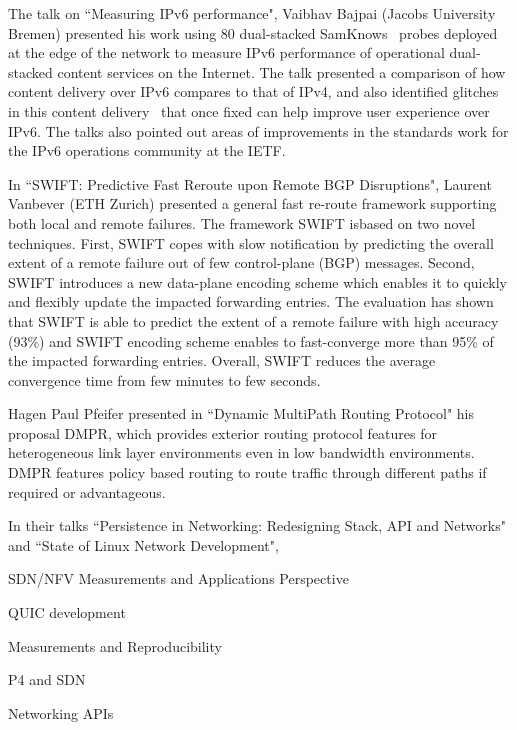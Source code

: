 The talk on ``Measuring IPv6 performance", Vaibhav Bajpai (Jacobs University
Bremen) presented his work using 80
dual-stacked SamKnows~\cite{vbajpai:comst:2015} probes deployed at the edge of
the network to measure IPv6 performance of operational dual-stacked content
services on the Internet. The talk presented a comparison of how content delivery
\cite{vbajpai:networking:2015, sahsan:pam:2015} over IPv6 compares to that of
IPv4, and also identified glitches in this content
delivery~\cite{seravuchira:cnsm:2016} that once fixed can help improve user
experience over IPv6. The talks also pointed out areas of improvements
\cite{vbajpai:anrw:2016} in the standards work for the IPv6 operations
community at the IETF\@.


In ``SWIFT: Predictive Fast Reroute upon Remote BGP Disruptions",
Laurent Vanbever (ETH Zurich) presented a general
fast re-route framework supporting both local and remote failures. The framework
SWIFT isbased on two novel techniques. First, SWIFT copes with slow notification by
predicting the overall extent of a remote failure out of few control-plane
(BGP) messages. Second, SWIFT introduces a new data-plane encoding scheme
which enables it to quickly and flexibly update the impacted forwarding
entries. The evaluation has shown that SWIFT is able to predict the extent of
a remote failure with high accuracy (93\%) and SWIFT encoding scheme enables
to fast-converge more than 95\% of the impacted forwarding entries. Overall,
SWIFT reduces the average convergence time from few minutes to few seconds.

Hagen Paul Pfeifer presented in ``Dynamic MultiPath Routing Protocol" his 
proposal \ac{DMPR}, which provides exterior routing protocol features for
heterogeneous link layer environments even in low bandwidth environments.
\ac{DMPR} features policy based routing to route traffic through
different paths if required or advantageous.

In their talks ``Persistence in Networking: Redesigning Stack, API and Networks"
and ``State of Linux Network Development", 


SDN/NFV Measurements and Applications Perspective

QUIC development

Measurements and Reproducibility

P4 and SDN

Networking APIs


